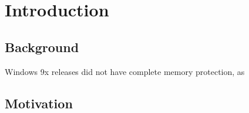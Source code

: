 
\chapter{Introduction}

\section{Background}

Windows 9x releases did not have complete memory protection, as 

\section{Motivation}
